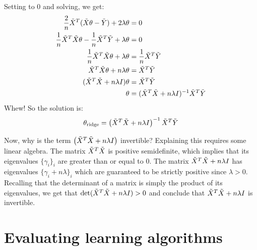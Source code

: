 Setting to 0 and solving, we get:
\begin{align*}
  \frac{2}{n}\tilde{X}^T(\tilde{X}\theta - \tilde{Y}) + 2 \lambda \theta             & = 0                                      \\
  \frac{1}{n}\tilde{X}^T\tilde{X}\theta - \frac{1}{n}\tilde{X}^T\tilde{Y} + \lambda \theta & = 0                                      \\
  \frac{1}{n}\tilde{X}^T\tilde{X}\theta  + \lambda \theta                      & = \frac{1}{n}\tilde{X}^T\tilde{Y}                    \\
  \tilde{X}^T\tilde{X}\theta  + n \lambda \theta                               & = \tilde{X}^T\tilde{Y}                               \\
  (\tilde{X}^T\tilde{X}  + n \lambda I)\theta                                  & = \tilde{X}^T\tilde{Y}                               \\
  \theta                                                           & = (\tilde{X}^T\tilde{X}  + n \lambda I)^{-1}\tilde{X}^T\tilde{Y}
\end{align*}
Whew!  So the solution is:
\begin{equation}
  \theta_{\text{ridge}} = \left(\tilde{X}^T\tilde{X} + n\lambda I\right)^{-1}\tilde{X}^T\tilde{Y}
  \label{eq:ridge_regression_solution}
\end{equation}

Now, why is the term $\left(\tilde{X}^T\tilde{X} + n\lambda I\right)$ invertible? 
Explaining this requires some linear algebra. The matrix $\tilde{X}^T\tilde{X}$ is positive 
semidefinite, which implies that its eigenvalues $\{\gamma_i\}_i$ are greater
than or equal to 0. The matrix $\tilde{X}^T\tilde{X}+n\lambda I$ has eigenvalues 
$\{\gamma_i+n\lambda\}_i$ which are guaranteed to be strictly positive since
$\lambda>0$. Recalling that the determinant of a matrix is simply the product of its eigenvalues, 
we get that $\det(\tilde{X}^T\tilde{X} + n\lambda I)>0$ and conclude that $\tilde{X}^T\tilde{X} + n\lambda I$ is invertible.




\section{Evaluating learning algorithms}\label{sec-reg_learn_alg}

